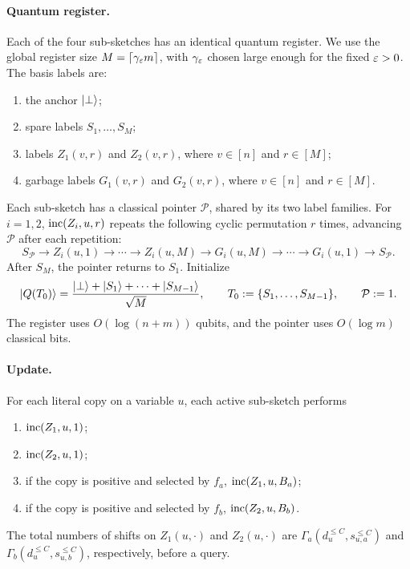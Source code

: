 \paragraph{Quantum register.}
Each of the four sub-sketches has an identical quantum register. We use the global register size $M=\lceil \gamma_{\varepsilon} m\rceil$, with $\gamma_\varepsilon$ chosen large enough for the fixed $\varepsilon>0$. The basis labels are:
\begin{enumerate}
  \item the anchor $\ket{\bot}$;
  \item spare labels $S_1,\ldots,S_M$;
  \item labels $Z_1(v,r)$ and $Z_2(v,r)$, where $v\in[n]$ and $r\in[M]$;
  \item garbage labels $G_1(v,r)$ and $G_2(v,r)$, where $v\in[n]$ and $r\in[M]$.
\end{enumerate}
Each sub-sketch has a classical pointer $\mathcal P$, shared by its two label families.
For $i=1,2$, $\mathrm{inc}(Z_i,u,r)$ repeats the following cyclic permutation $r$ times, advancing $\mathcal P$ after each repetition:
\[
  S_{\mathcal P}\to Z_i(u,1)\to\cdots\to Z_i(u,M)
  \to G_i(u,M)\to\cdots\to G_i(u,1)\to S_{\mathcal P}.
\]
After $S_M$, the pointer returns to $S_1$.
Initialize
\[
  \left|Q(T_0)\right\rangle
  =\frac{\ket{\bot}+\ket{S_1}+\cdots+\ket{S_{M-1}}}{\sqrt M},
  \qquad T_0:=\{S_1,\ldots,S_{M-1}\},\qquad\mathcal P:=1.
\]
The register uses $O(\log(n+m))$ qubits, and the pointer uses $O(\log m)$ classical bits.

\paragraph{Update.}
For each literal copy on a variable $u$, each active sub-sketch performs
\begin{enumerate}
  \item $\mathrm{inc}(Z_1,u,1)$;
  \item $\mathrm{inc}(Z_2,u,1)$;
  \item if the copy is positive and selected by $f_a$, $\mathrm{inc}(Z_1,u,B_a)$;
  \item if the copy is positive and selected by $f_b$, $\mathrm{inc}(Z_2,u,B_b)$.
\end{enumerate}
The total numbers of shifts on $Z_1(u,\cdot)$ and $Z_2(u,\cdot)$ are $\Gamma_a(d_u^{\le C},s_{u,a}^{\le C})$ and $\Gamma_b(d_u^{\le C},s_{u,b}^{\le C})$, respectively, before a query.


